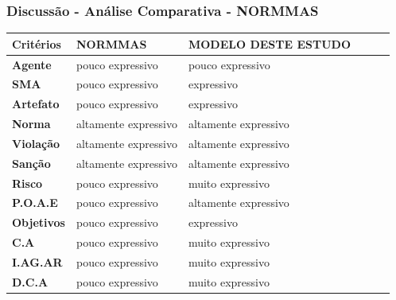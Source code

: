\documentclass{beamer}
\begin{document}
\begin{frame}
	\frametitle{Discussão - Análise Comparativa - NORMMAS}
	\begin{table}[H]
	    \begin{tabular}{|l|l|l|l|l|l|}
	        \textbf{Critérios} 	&	 \textbf{NORMMAS}     	&	 \textbf{MODELO DESTE ESTUDO} \\ \hline
	        \textbf{Agente}    	&	 pouco expressivo     	&	 pouco expressivo             \\ \hline
	        \textbf{SMA}       	&	 pouco expressivo     	&	 expressivo                   \\ \hline
	        \textbf{Artefato}  	&	 pouco expressivo     	&	 expressivo                   \\ \hline
	        \textbf{Norma}     	&	 altamente expressivo 	&	 altamente expressivo         \\ \hline
	        \textbf{Violação}  	&	 altamente expressivo 	&	 altamente expressivo         \\ \hline
	        \textbf{Sanção}    	&	 altamente expressivo 	&	 altamente expressivo         \\ \hline
	        \textbf{Risco}     	&	 pouco expressivo     	&	 muito expressivo             \\ \hline
	        \textbf{P.O.A.E}   	&	 pouco expressivo     	&	 altamente expressivo         \\ \hline
	        \textbf{Objetivos} 	&	 pouco expressivo     	&	 expressivo             	  \\ \hline
	        \textbf{C.A}       	&	 pouco expressivo     	&	 muito expressivo             \\ \hline
	        \textbf{I.AG.AR}   	&	 pouco expressivo     	&	 muito expressivo             \\ \hline
	        \textbf{D.C.A}     	&	 pouco expressivo     	&	 muito expressivo             \\ \hline
	    \end{tabular}
	\end{table}
\end{frame}
\end{document}
